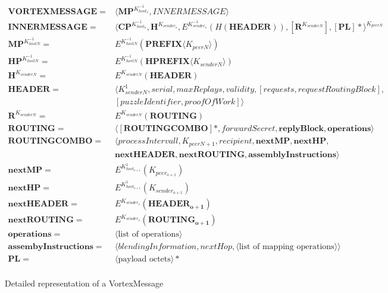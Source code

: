 \begin{figure}[!ht]
	\begin{align}
	\mathbf{VORTEXMESSAGE}       = &\langle \mathbf{MP}^{K^{-1}_{host_o}}, INNERMESSAGE \rangle \label{eq:vortexMessage} \\ 
	\mathbf{INNERMESSAGE}        = &\langle \mathbf{CP}^{K^{-1}_{host_o}}, \mathbf{H}^{K_{sender_o}}, E^{K^{-1}_{sender_o}}\left(H\left(\mathbf{HEADER}\right)\right), \left[\mathbf{R}^{K_{senderN}}\right], \left[\mathbf{PL}\right]*\rangle^{K_{peerN}} \label{eq:innerMessage}\\
	\mathbf{MP}^{K^{-1}_{hostN}} = &E^{K^{-1}_{hostN}}\left(\mathbf{PREFIX}\langle K_{peerN}\rangle \right)\\ 
	\mathbf{HP}^{K^{-1}_{hostN}} = &E^{K^{-1}_{hostN}}\left(\mathbf{HPREFIX}\langle K_{senderN}\rangle \right)\\ 
	\mathbf{H}^{K_{senderN}}     = &E^{K_{senderN}}\left(\mathbf{HEADER}\right)\\  
	\mathbf{HEADER}              = &\langle K^{1}_{senderN}, serial, maxReplays, validity, [requests, requestRoutingBlock],\nonumber\\ 
	& [puzzleIdentifier, proofOfWork] \rangle \\  
	\mathbf{R}^{K_{senderN}}     = & E^{K_{senderN}}\left(\mathbf{ROUTING}\right)\\ 
	\mathbf{ROUTING}             = & \langle [ \mathbf{ROUTINGCOMBO} ] *, forwardSecret, \mathbf{replyBlock},\mathbf{operations} \rangle\\  
	\mathbf{ROUTINGCOMBO}        = & \langle processIntervall, K_{peerN+1}, recipient, \mathbf{nextMP}, \mathbf{nextHP}, \nonumber \\
	& \mathbf{nextHEADER}, \mathbf{nextROUTING}, \mathbf{assemblyInstructions} \rangle\\
	\mathbf{nextMP}              = & E^{K^1_{host_{o+1}}} \left( K_{peer_{o+1}} \right)\\
	\mathbf{nextHP}              = & E^{K^1_{host_{o+1}}} \left( K_{sender_{o+1}} \right)\\
	\mathbf{nextHEADER}          = & E^{K_{sender_o}} \left( \mathbf{HEADER_{o+1}} \right)\\
	\mathbf{nextROUTING}         = & E^{K_{sender_o}} \left( \mathbf{ROUTING_{o+1}} \right)\\    
	\mathbf{operations}          = & \langle \text{list of operations} \rangle \\
	\mathbf{assembyInstructions} = & \langle  blendingInformation, nextHop, \langle \text{list of mapping operations}\rangle\rangle\\
	\mathbf{PL}                  = &\langle \text{payload octets} \rangle *\\ 
	\end{align}
	\caption{Detailed representation of a VortexMessage}
	\label{fig:mathMessage}
\end{figure}

